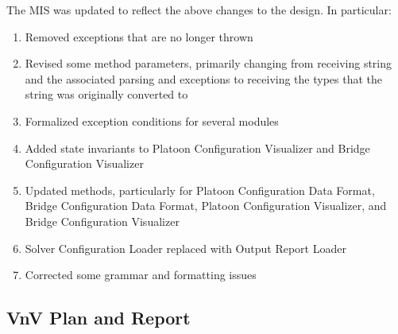\documentclass{article}
\begin{document}
The MIS was updated to reflect the above changes to the design. In particular:
\begin{enumerate}
  \item Removed exceptions that are no longer thrown
  \item Revised some method parameters, primarily changing from receiving string and the associated parsing and exceptions to receiving the types that the string was originally converted to
  \item Formalized exception conditions for several modules
  \item Added state invariants to Platoon Configuration Visualizer and Bridge Configuration Visualizer
  \item Updated methods, particularly for Platoon Configuration Data Format, Bridge Configuration Data Format, Platoon Configuration Visualizer, and Bridge Configuration Visualizer
  \item Solver Configuration Loader replaced with Output Report Loader
  \item Corrected some grammar and formatting issues
\end{enumerate}

\subsection{VnV Plan and Report}
\end{document}

